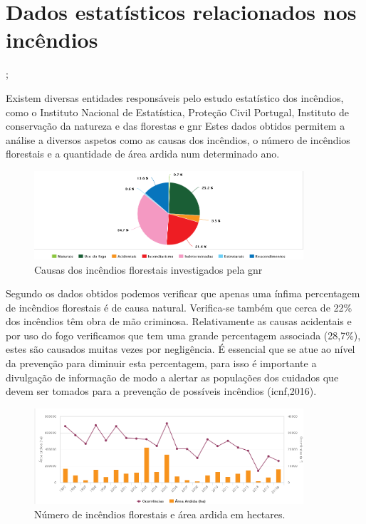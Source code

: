 \documentclass{report}
\begin{document}
\chapter{Dados estatísticos relacionados nos incêndios}
\label{dados estatísticos relacionados nos incêndios};
\cite{ICNF}

Existem diversas entidades responsáveis pelo estudo estatístico dos incêndios, como o Instituto Nacional de Estatística, Proteção Civil Portugal, Instituto de conservação da natureza e das florestas e \ac{gnr}
Estes dados obtidos permitem a análise a diversos aspetos como as causas dos incêndios, o número de incêndios florestais e a quantidade de área ardida num determinado ano.

\begin{figure}[H]
\center
\includegraphics[width=10cm]{circular.png}
\caption{Causas dos incêndios florestais investigados pela \ac{gnr}}
\end{figure}

Segundo os dados obtidos podemos verificar que apenas uma ínfima percentagem de incêndios florestais é de causa natural.
Verifica-se também que cerca de 22\% dos incêndios têm obra de mão criminosa.
Relativamente as causas acidentais e por uso do fogo verificamos que tem uma grande percentagem associada (28,7\%), estes são causados muitas vezes por negligência. É essencial que se atue ao nível da prevenção para diminuir esta percentagem, para isso é importante a divulgação de informação de modo a alertar as populações dos cuidados que devem ser tomados para a prevenção de possíveis incêndios (\ac{icnf},2016).

\begin{figure}[H]
\center
\includegraphics[width=10cm]{barras.png}
\caption{Número de incêndios florestais e área ardida em hectares.}
\end{figure}
\end{document}
